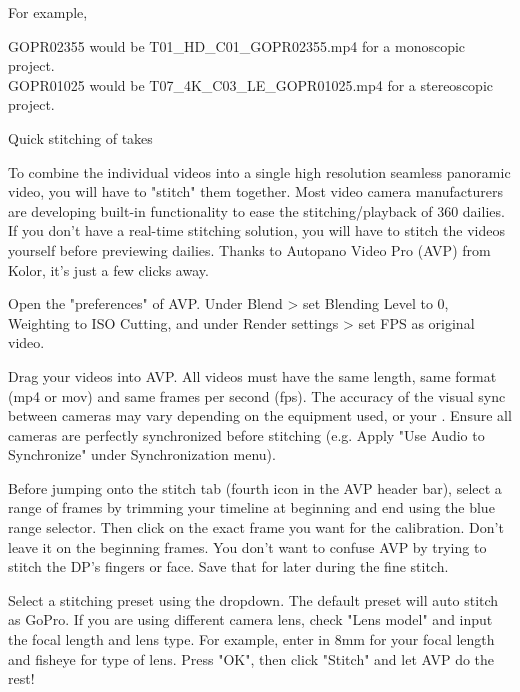 \begin{fullwidth}
For example,

GOPR02355 would be T01\_HD\_C01\_GOPR02355.mp4 for a monoscopic project.
\\
GOPR01025 would be T07\_4K\_C03\_LE\_GOPR01025.mp4 for a stereoscopic project.

{\large Quick stitching of takes \par}

To combine the individual videos into a single high resolution seamless panoramic video, you will have to "stitch" them together. Most video camera manufacturers are developing built-in functionality to ease the stitching/playback of 360 dailies. If you don't have a real-time stitching solution, you will have to stitch the videos yourself before previewing dailies. Thanks to Autopano Video Pro (AVP) from Kolor, it's just a few clicks away.

Open the "preferences" of AVP. Under Blend > set Blending Level to 0, Weighting to ISO Cutting, and under Render settings > set FPS as original video.


Drag your videos into AVP. All videos must have the same length, same format (mp4 or mov) and same frames per second (fps). The accuracy of the visual sync between cameras may vary depending on the equipment used, or your \textbf{}. Ensure all cameras are perfectly synchronized before stitching (e.g. Apply "Use Audio to Synchronize" under Synchronization menu).


Before jumping onto the stitch tab (fourth icon in the AVP header bar), select a range of frames by trimming your timeline at beginning and end using the blue range selector. Then click on the exact frame you want for the calibration. Don't leave it on the beginning frames. You don't want to confuse AVP by trying to stitch the DP's fingers or face. Save that for later during the fine stitch. 


Select a stitching preset using the dropdown. The default preset will auto stitch as GoPro. If you are using different camera lens, check "Lens model" and input the focal length and lens type. For example, enter in 8mm for your focal length and fisheye for type of lens. Press "OK", then click "Stitch" and let AVP do the rest!



\end{fullwidth}
